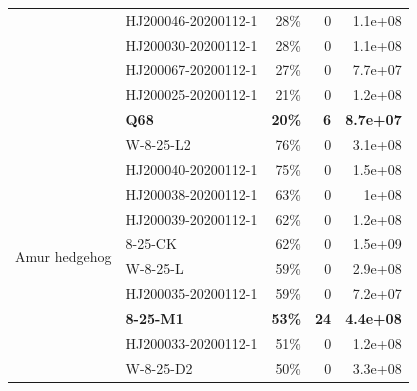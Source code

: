 \documentclass[9pt,twocolumn,twoside]{gsajnl_modified}
\begin{document}
\begin{table}
{\begin{tabular}{llrrr}
                  & HJ200046-20200112-1 &                                       28\% &                        0 &                   1.1e+08 \\
                  & HJ200030-20200112-1 &                                       28\% &                        0 &                   1.1e+08 \\
                  & HJ200067-20200112-1 &                                       27\% &                        0 &                   7.7e+07 \\
                  & HJ200025-20200112-1 &                                       21\% &                        0 &                   1.2e+08 \\
                  & {\bf Q68} &                                       {\bf 20\%} &                        {\bf 6} &                   {\bf 8.7e+07} \\
\cline{1-5}
\multirow{15}{*}{Amur hedgehog} & W-8-25-L2 &                                       76\% &                        0 &                   3.1e+08 \\
                  & HJ200040-20200112-1 &                                       75\% &                        0 &                   1.5e+08 \\
                  & HJ200038-20200112-1 &                                       63\% &                        0 &                     1e+08 \\
                  & HJ200039-20200112-1 &                                       62\% &                        0 &                   1.2e+08 \\
                  & 8-25-CK &                                       62\% &                        0 &                   1.5e+09 \\
                  & W-8-25-L &                                       59\% &                        0 &                   2.9e+08 \\
                  & HJ200035-20200112-1 &                                       59\% &                        0 &                   7.2e+07 \\
                  & {\bf 8-25-M1} &                                      {\bf 53\%} &                      {\bf 24} &                   {\bf 4.4e+08} \\
                  & HJ200033-20200112-1 &                                       51\% &                        0 &                   1.2e+08 \\
                  & W-8-25-D2 &                                       50\% &                        0 &                   3.3e+08 \\

\end{tabular}}
\end{table}
\end{document}
